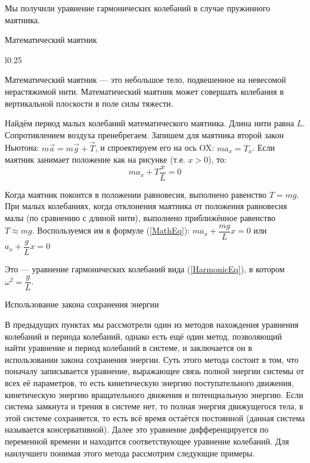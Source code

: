 \documentclass[a4paper,12pt]{article} %
\begin{document}
Мы получили уравнение гармонических колебаний в случае пружинного маятника.

\begin{center}
\large Математический маятник
\end{center}

\begin{wrapfigure}{l}{0.25\textwidth}
	\vspace{-4ex}
	
	\vspace{-5ex}
\end{wrapfigure}

Математический маятник — это небольшое тело, подвешенное на невесомой
нерастяжимой нити. Математический маятник может совершать колебания в
вертикальной плоскости в поле силы тяжести.

Найдём период малых колебаний математического маятника. Длина нити равна $L$.
Сопротивлением воздуха пренебрегаем. Запишем для маятника второй закон Ньютона:
$m\vec a=m\vec g+\vec T$, и спроектируем его на ось OX: $ma_x=T_x$. Если маятник занимает
положение как на рисунке (т.е. $x > 0$), то: 
\begin{equation} \label{MathEq}
	ma_x+T \dfrac{x}{L}=0
\end{equation}

Когда маятник покоится в положении равновесия, выполнено равенство $T = mg$.
При малых колебаниях, когда отклонения маятника от положения равновесия малы (по
сравнению с длиной нити), выполнено приближённое равенство $T \approx mg$. Воспользуемся
им в формуле (\ref{MathEq}): $ma_x + \dfrac{mg}{L}x = 0 $ или $a_x + \dfrac{g}{L}x = 0$

Это — уравнение гармонических колебаний вида (\ref{HarmonicEq}), в котором $\omega^2 = \dfrac{g}{L}$.

\begin{center}
\large Использование закона сохранения энергии
\end{center}

В предыдущих пунктах мы рассмотрели один из методов нахождения уравнения
колебаний и периода колебаний, однако есть ещё один метод, позволяющий найти
уравнение и период колебаний в системе, и заключается он в использовании закона
сохранения энергии. Суть этого метода состоит в том, что поначалу записывается
уравнение, выражающее связь полной энергии системы от всех её параметров, то есть
кинетическую энергию поступательного движения, кинетическую энергию
вращательного движения и потенциальную энергию. Если система замкнута и трения в
системе нет, то полная энергия движущегося тела, в этой системе сохраняется, то есть
всё время остаётся постоянной (данная система называется консервативной). Далее это
уравнение дифференцируется по переменной времени и находится соответствующее
уравнение колебаний. Для наилучшего понимая этого метода рассмотрим следующие
примеры.
\end{document}
